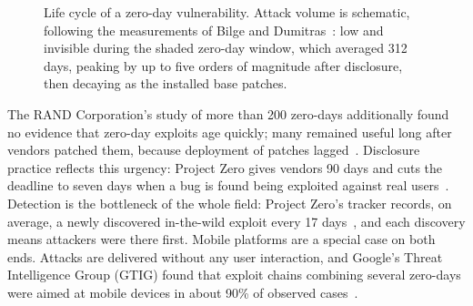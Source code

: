 \documentclass[conference,a4paper]{IEEEtran}
\begin{document}
\begin{figure}[htbp]
\centering
{}
\caption{Life cycle of a zero-day vulnerability. Attack volume is
schematic, following the measurements of Bilge and
Dumitras~\cite{bilge2012before}: low and invisible during the shaded
zero-day window, which averaged 312 days, peaking by up to five orders of
magnitude after disclosure, then decaying as the installed base patches.}
\label{fig:lifecycle}
\end{figure} The
RAND Corporation's study of more than 200 zero-days additionally found no
evidence that zero-day exploits age quickly; many remained useful long
after vendors patched them, because deployment of patches
lagged~\cite{ablon2017zero}. Disclosure practice reflects this urgency:
Project Zero gives vendors 90 days and cuts the deadline to seven days
when a bug is found being exploited against real users~\cite{p0policy}.
Detection is the bottleneck of the whole field: Project Zero's tracker
records, on average, a newly discovered in-the-wild exploit every 17
days~\cite{p0tracker}, and each discovery means attackers were there
first. Mobile platforms are a special case on both ends. Attacks are
delivered without any user interaction, and Google's Threat Intelligence
Group (GTIG) found that exploit chains combining several zero-days were
aimed at mobile devices in about 90\% of observed
cases~\cite{charrier2025zeroday}.
\end{document}
